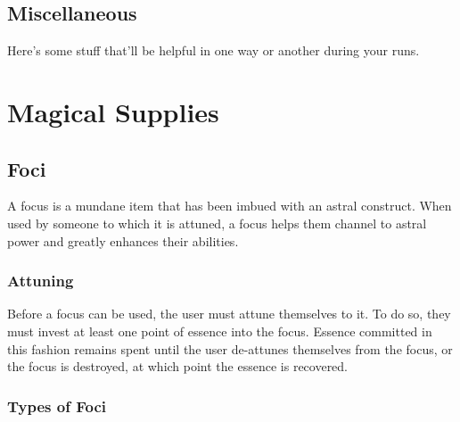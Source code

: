 \subsection{Miscellaneous}

Here's some stuff that'll be helpful in one way or another during your runs.




\section{Magical Supplies}

\subsection{Foci}
A focus is a mundane item that has been imbued with an astral construct. When used by someone to which it is attuned, a focus helps them channel to astral power and greatly enhances their abilities.

\subsubsection{Attuning}
Before a focus can be used, the user must attune themselves to it. To do so, they must invest at least one point of essence into the focus. Essence committed in this fashion remains spent until the user de-attunes themselves from the focus, or the focus is destroyed, at which point the essence is recovered.

\subsubsection{Types of Foci}
